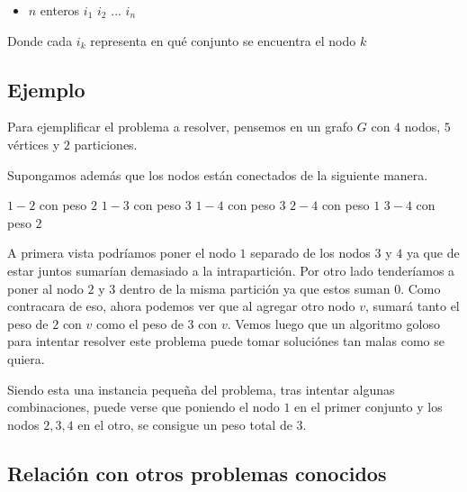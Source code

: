 \begin{itemize}

\item $n$ enteros $i_1$ $i_2$ $...$ $i_n$

\end{itemize}

Donde cada $i_k$ representa en qué conjunto se encuentra el nodo $k$

\subsection{Ejemplo}

Para ejemplificar el problema a resolver, pensemos en un grafo $G$ con $4$ nodos, $5$ vértices y $2$ particiones.

Supongamos además que los nodos están conectados de la siguiente manera.

$1-2$ con peso $2$
$1-3$ con peso $3$
$1-4$ con peso $3$
$2-4$ con peso $1$
$3-4$ con peso $2$

A primera vista podríamos poner el nodo $1$ separado de los nodos $3$ y $4$ ya que de estar juntos sumarían demasiado a la intrapartición. Por otro lado tenderíamos a poner al nodo $2$ y $3$ dentro de la misma partición ya que estos suman $0$. Como contracara de eso, ahora podemos ver que al agregar otro nodo $v$, sumará tanto el peso de $2$ con $v$ como el peso de $3$ con $v$. Vemos luego que un algoritmo goloso para intentar resolver este problema puede tomar soluciónes tan malas como se quiera.

Siendo esta una instancia pequeña del problema, tras intentar algunas combinaciones, puede verse que poniendo el nodo $1$ en el primer conjunto y los nodos $2,3,4$ en el otro, se consigue un peso total de $3$.

\subsection{Relación con otros problemas conocidos}

